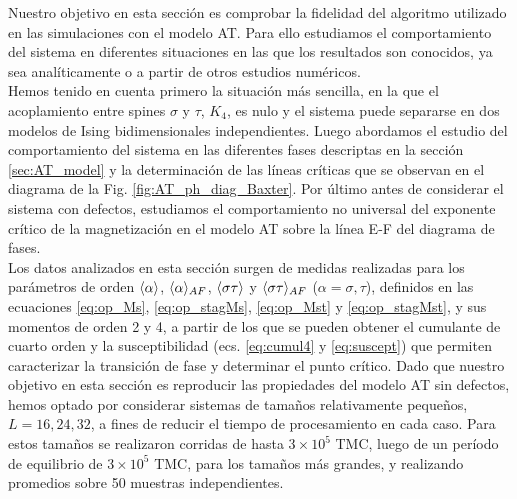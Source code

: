 Nuestro objetivo en esta sección es comprobar la fidelidad del algoritmo utilizado en las simulaciones con el modelo AT. Para ello estudiamos
 el comportamiento del sistema en diferentes situaciones en las que los resultados son conocidos, ya sea analíticamente o a partir de otros estudios numéricos.\\
Hemos tenido en cuenta primero la situación más sencilla, en la que el acoplamiento entre spines $\sigma$ y $\tau$, $K_{4}$, es nulo y el sistema puede separarse
 en dos modelos de Ising bidimensionales independientes. Luego abordamos el estudio del comportamiento del sistema en las diferentes fases descriptas en
 la sección \ref{sec:AT_model} y la determinación de las líneas críticas que se observan en el diagrama de la Fig. \ref{fig:AT_ph_diag_Baxter}. Por último antes de considerar
 el sistema con defectos, estudiamos el comportamiento no universal del exponente crítico de la magnetización en el modelo AT sobre la línea E-F del diagrama de fases.\\


Los datos analizados en esta sección surgen de medidas realizadas para los parámetros de orden $\langle \alpha \rangle$, $\langle \alpha \rangle_{AF}$,
 $\langle \sigma\tau \rangle$ y $\langle \sigma\tau \rangle_{AF}$ ($\alpha=\sigma, \tau$), definidos en las ecuaciones \ref{eq:op_Ms}, \ref{eq:op_stagMs}, \ref{eq:op_Mst} y
 \ref{eq:op_stagMst}, y sus momentos de orden 2 y 4, a partir de los que se pueden obtener el cumulante de cuarto orden y la
 susceptibilidad (ecs. \ref{eq:cumul4} y \ref{eq:suscept}) que permiten
 caracterizar la transición de fase y determinar el punto crítico.
Dado que nuestro objetivo en esta sección es reproducir las propiedades del modelo AT sin defectos, hemos optado por considerar sistemas de tamaños relativamente
 pequeños, $L=16,24,32$, a fines de reducir el tiempo de procesamiento en cada caso.
Para estos tamaños se realizaron corridas de hasta $3\times 10^{5}$ TMC, luego de un período de equilibrio de $3\times 10^{5}$ TMC, para los tamaños más grandes,
 y realizando promedios sobre 50 muestras independientes.\\


